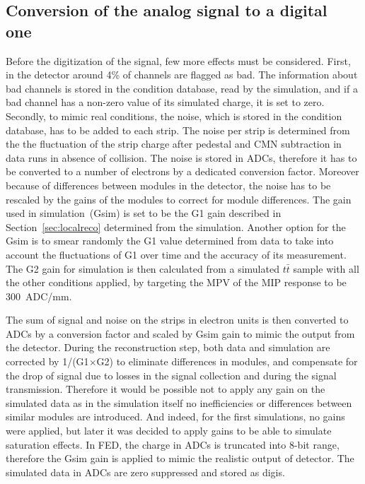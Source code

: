 \subsection{Conversion of the analog signal to a digital one~\label{sec:digitize}}

Before the digitization of the signal, few more effects must be considered. First, in the detector around 4\% of channels are flagged as bad. The information about bad channels is stored in the condition database, read by the simulation, and if a bad channel has a non-zero value of its simulated charge, it is set to zero. Secondly, to mimic real conditions, the noise, which is stored in the condition database, has to be added to each strip. The noise per strip is determined from the the fluctuation of the strip charge after pedestal and CMN subtraction in data runs in absence of collision. The noise is stored in ADCs, therefore it has to be converted to a number of electrons by a dedicated conversion factor. Moreover because of differences between modules in the detector, the noise has to be rescaled by the gains of the modules to correct for module differences. The gain used in simulation~(Gsim) is set to be the G1 gain described in Section~\ref{sec:localreco} determined from the simulation. Another option for the Gsim is to smear randomly the G1 value determined from data to take into account the fluctuations of G1 over time and the accuracy of its measurement. The G2 gain for simulation is then calculated from a simulated $t\bar{t}$ sample with all the other conditions applied, by targeting the MPV of the MIP response to be 300~ADC/mm.

 The sum of signal and noise on the strips in electron units is then converted to ADCs by a conversion factor and scaled by Gsim gain to mimic the output from the detector. During the reconstruction step, both data and simulation are corrected by 1/(G1$\times$G2) to eliminate differences in modules, and compensate for the drop of signal due to losses in the signal collection and during the signal transmission. Therefore it would be possible not to apply any gain on the simulated data as in the simulation itself no inefficiencies or differences between similar modules are introduced. And indeed, for the first simulations, no gains were applied, but later it was decided to apply gains to be able to simulate saturation effects. In FED, the charge in ADCs is truncated into 8-bit range, therefore the Gsim gain is applied to mimic the realistic output of detector. The simulated data in ADCs are zero suppressed and stored as digis.

